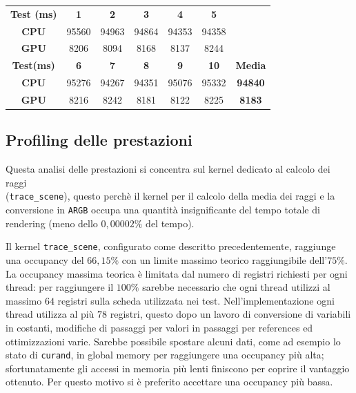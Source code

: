 \documentclass[12pt, twoside]{article}
\begin{document}
\begin{table}[h]
  \centering
  \begin{tabular}{ccccccc}
    \rowcolor[HTML]{C0C0C0} 
    \textbf{Test (ms)}                   & \textbf{1}                    & \textbf{2} & \textbf{3} & \textbf{4} & \cellcolor[HTML]{C0C0C0}\textbf{5} & \textbf{}      \\
    \cellcolor[HTML]{FFFFFF}\textbf{CPU} & \cellcolor[HTML]{FFFFFF}95560 & 94963      & 94864      & 94353      & 94358                              &                \\
    \rowcolor[HTML]{EFEFEF} 
    \cellcolor[HTML]{EFEFEF}\textbf{GPU} & 8206                          & 8094       & 8168       & 8137       & 8244                               &                \\
    \rowcolor[HTML]{C0C0C0} 
    \textbf{Test(ms)}                    & \textbf{6}                    & \textbf{7} & \textbf{8} & \textbf{9} & \textbf{10}                        & \textbf{Media} \\
    \cellcolor[HTML]{FFFFFF}\textbf{CPU} & 95276                         & 94267      & 94351      & 95076      & 95332                              & \textbf{94840} \\
    \rowcolor[HTML]{EFEFEF} 
    \textbf{GPU}                         & 8216                          & 8242       & 8181       & 8122       & 8225                               & \textbf{8183} 
  \end{tabular}
\end{table}

\subsection{Profiling delle prestazioni}

Questa analisi delle prestazioni si concentra sul kernel dedicato al calcolo
dei raggi \\(\texttt{trace\_scene}), questo perchè il kernel per il calcolo della
media dei raggi e la conversione in \texttt{ARGB} occupa una quantità
insignificante del tempo totale di rendering (meno dello $0,00002\%$ del
tempo).

Il kernel \texttt{trace\_scene}, configurato come descritto precedentemente,
raggiunge una occupancy del $66,15\%$ con un limite massimo teorico
raggiungibile dell'$75\%$.
La occupancy massima teorica è limitata dal numero di registri richiesti per
ogni thread: per raggiungere il $100\%$ sarebbe necessario che ogni thread
utilizzi al massimo $64$ registri sulla scheda utilizzata nei test.
Nell'implementazione ogni thread utilizza al più $78$ registri, questo dopo
un lavoro di conversione di variabili in costanti, modifiche di passaggi
per valori in passaggi per references ed ottimizzazioni varie.
Sarebbe possibile spostare alcuni dati, come ad esempio lo stato di
\texttt{curand}, in global memory per raggiungere una occupancy più alta;
sfortunatamente gli accessi in memoria più lenti finiscono per coprire il
vantaggio ottenuto.
Per questo motivo si è preferito accettare una occupancy più bassa.
\end{document}
